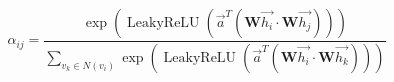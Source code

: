 \begin{equation}
    \alpha_{ij} = \frac{\exp(\operatorname{LeakyReLU}(\vec{a}^{T} (\mathbf{W}\vec{h_i} \cdot \mathbf{W}\vec{h_j})))}
    {\sum_ {v_k\in N(v_i)} \exp(\operatorname{LeakyReLU}(\vec{a}^T (\mathbf{W}\vec{h_i} \cdot \mathbf{W}\vec{h_k}))) }
    \label{formula:影响力权重}
\end{equation}